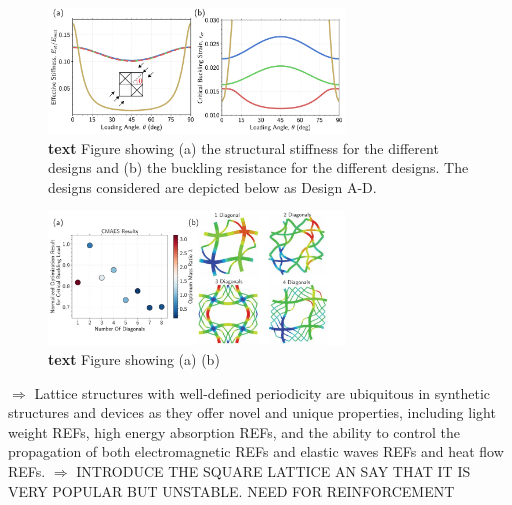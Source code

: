 \documentclass[9pt,twocolumn,twoside]{fernandes_paper}
\newcommand{\KB}[1]{\noindent\color{blue}$\Longrightarrow$ #1\normalcolor}
\begin{document}
\begin{figure}[ht]
	\captionsetup{width=0.8\textwidth}
	\begin{center}
		\includegraphics[width=0.7\textwidth]{Fig3}
	\end{center}
	\caption{\textbf{text} Figure showing (a) the structural stiffness for the different designs and (b) the buckling resistance for the different designs. The designs considered are depicted below as Design A-D.} \label{Fig3}
\end{figure}

\begin{figure}[ht]
	\captionsetup{width=0.8\textwidth}
	\begin{center}
		\includegraphics[width=0.7\textwidth]{Fig4}
	\end{center}
	\caption{\textbf{text} Figure showing (a) (b)} \label{Fig4}
\end{figure}


\KB{Lattice structures with well-defined periodicity are ubiquitous
 in synthetic structures and
devices as they offer novel and unique
properties, including light weight REFs,  high energy absorption REFs,
 and the ability to control the propagation of both
electromagnetic REFs and elastic waves REFs and heat flow REFs.} \KB{INTRODUCE THE SQUARE LATTICE AN SAY THAT IT IS VERY POPULAR BUT UNSTABLE. NEED FOR REINFORCEMENT}
\end{document}
